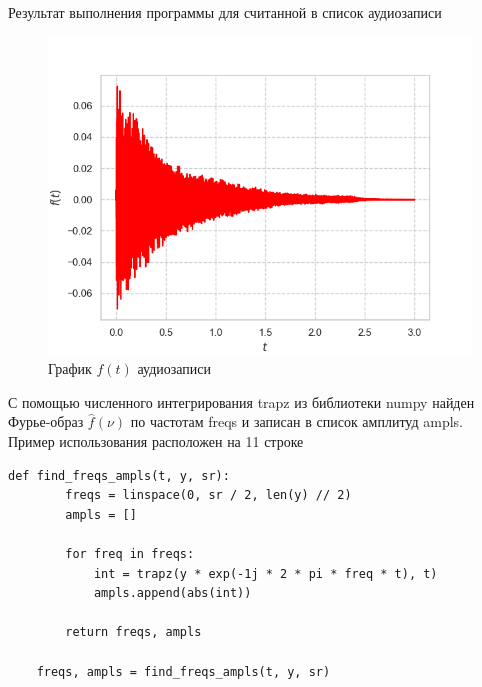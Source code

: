 \documentclass[a4paper, 16pt]{article}
\begin{document}
    \noindent Результат выполнения программы для считанной в список аудиозаписи
    \begin{figure}[!htb]
        \centering
        \includegraphics[scale=0.6]{f_t.png}
        \captionsetup{skip=0pt}
        \caption{График $f(t)$ аудиозаписи}
        \label{Рис:15}
    \end{figure}


    \noindent С помощью численного интегрирования trapz из библиотеки numpy найден Фурье-образ $\hat{f}(\nu)$
    по частотам freqs и записан в список амплитуд ampls. Пример использования расположен на 11 строке
    \begin{lstlisting}[label=fimgmp3, caption=Программа для нахождения Фурье-образа аудиозаписи]
    def find_freqs_ampls(t, y, sr):
        freqs = linspace(0, sr / 2, len(y) // 2)
        ampls = []
    
        for freq in freqs:
            int = trapz(y * exp(-1j * 2 * pi * freq * t), t)
            ampls.append(abs(int))
    
        return freqs, ampls

    freqs, ampls = find_freqs_ampls(t, y, sr)
    \end{lstlisting}
\end{document}
